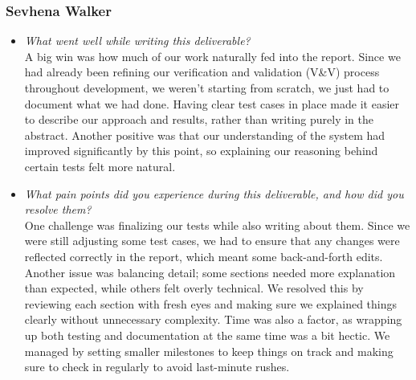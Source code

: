 \documentclass[12pt, titlepage]{article}
\begin{document}
\subsubsection*{Sevhena Walker}
\begin{itemize}
  \item \textit{What went well while writing this deliverable?} \\

    A big win was how much of our work naturally fed into the report.
    Since we had already been refining our verification and
    validation (V\&V) process throughout development, we weren't
    starting from scratch, we just had to document what we had done.
    Having clear test cases in place made it easier to describe our
    approach and results, rather than writing purely in the abstract.
    Another positive was that our understanding of the system had
    improved significantly by this point, so explaining our reasoning
    behind certain tests felt more natural.

  \item \textit{What pain points did you experience during this
    deliverable, and how did you resolve them?}\\

    One challenge was finalizing our tests while also writing about
    them. Since we were still adjusting some test cases, we had to
    ensure that any changes were reflected correctly in the report,
    which meant some back-and-forth edits. Another issue was
    balancing detail; some sections needed more explanation than
    expected, while others felt overly technical. We resolved this by
    reviewing each section with fresh eyes and making sure we
    explained things clearly without unnecessary complexity. Time was
    also a factor, as wrapping up both testing and documentation at
    the same time was a bit hectic. We managed by setting smaller
    milestones to keep things on track and making sure to check in
    regularly to avoid last-minute rushes.
\end{itemize}
\end{document}
